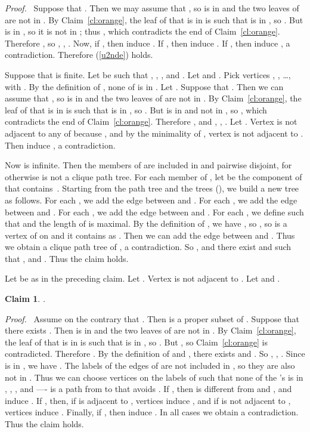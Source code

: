 \documentclass[11pt]{article}
\newtheorem{claim}{Claim}
\newenvironment{proofcl}{\noindent \emph{Proof.}\ }{Thus the claim
holds.  \hfill \vspace{1em}}
\begin{document}
\begin{proofcl}
Suppose that .  Then we may assume
that , so  is in  and the two leaves of 
are not in .  By Claim~\ref{cl:orange}, the leaf  of
 that is in  is such that  is in
, so .  But  is in , so it is
not in ; thus , which contradicts the
end of Claim~\ref{cl:orange}.  Therefore , so , , .  Now, if
, then  induce .  If ,
then  induce .  If ,
then  induce
, a contradiction.  Therefore (\ref{u2nde})
holds.

\medskip

Suppose that  is finite.  Let  be such that , ,
, and .
Let  and .  Pick vertices , ,
\ldots,  with .  By the definition of
, none of  is in .  Let .  Suppose that .  Then we
can assume that , so  is in  and the two leaves of
 are not in .  By Claim~\ref{cl:orange}, the leaf
 of  that is in  is such that
 is in , so .  But  is in 
and not in , so , which
contradicts the end of Claim~\ref{cl:orange}.  Therefore , and , , .  Let .  Vertex  is not
adjacent to any of  because
, and by the minimality of , vertex  is
not adjacent to .  Then  induce
, a contradiction.

Now  is infinite.  Then the members of  are included in  and pairwise disjoint, for otherwise 
is not a clique path tree.  For each member  of , let  be the component of 
that contains~.  Starting from the path tree  and the trees
 (), we build a new tree as
follows.  For each , we add the
edge  between  and .  For each , we add the edge  between  and .  For
each , we
add the edge  between  and .  For each , we define  such that  and the length of
 is maximal.  By the definition of , we have
, so , so  is a vertex of 
on  and it contains  as .  Then we
can add the edge  between  and .  Thus we obtain a
clique path tree of , a contradiction.  So , and there exist
 and  such that ,  and .
\end{proofcl}


Let  be as in the preceding claim.  Let .  Vertex  is not adjacent to .  Let  and .

\begin{claim}
\label{claim:egal}
    .
\end{claim}
\begin{proofcl}
Assume on the contrary that .  Then  is a proper
subset of .  Suppose that there exists .  Then  is in  and the two leaves of 
are not in .  By Claim~\ref{cl:orange}, the leaf  of
 that is in  is such that  is in ,
so .  But , so Claim~\ref{cl:orange} is
contradicted.  Therefore .  By the
definition of  and , there exists  and .  So , , .  Since  is in , we have .  The labels of the edges
of  are not included in , so they are also not in .
Thus we can choose vertices  on the labels of
 such that none of the 's is in , ,
, and ---- is a path from  to 
that avoids .  If , then  is different from  and
, and  induce .  If ,
then, if  is adjacent to , vertices  induce , and if  is not adjacent to , vertices
 induce .  Finally, if ,
then  induce .
In all cases we obtain a contradiction.
\end{proofcl}
\end{document}
